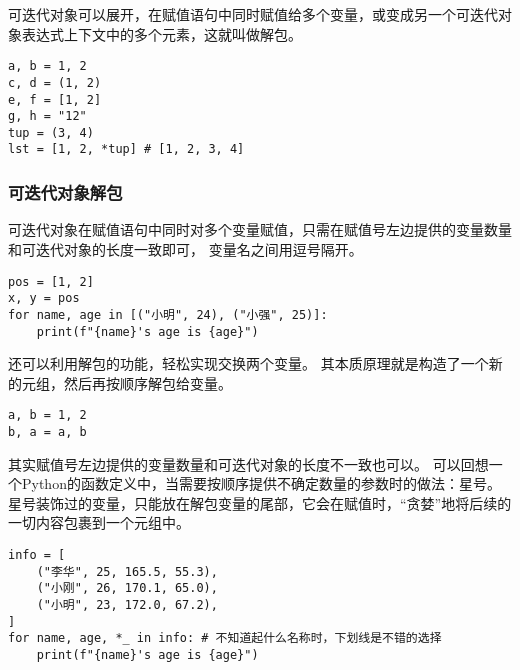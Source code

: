 \documentclass{ctexbook}
\begin{document}
可迭代对象可以展开，在赋值语句中同时赋值给多个变量，或变成另一个可迭代对象表达式上下文中的多个元素，这就叫做解包。

\begin{verbatim}
a, b = 1, 2
c, d = (1, 2)
e, f = [1, 2]
g, h = "12"
tup = (3, 4)
lst = [1, 2, *tup] # [1, 2, 3, 4]
\end{verbatim}

\subsubsection{可迭代对象解包}
可迭代对象在赋值语句中同时对多个变量赋值，只需在赋值号左边提供的变量数量和可迭代对象的长度一致即可，
变量名之间用逗号隔开。


\begin{verbatim}
pos = [1, 2]
x, y = pos
for name, age in [("小明", 24), ("小强", 25)]:
    print(f"{name}'s age is {age}")
\end{verbatim}

还可以利用解包的功能，轻松实现交换两个变量。
其本质原理就是构造了一个新的元组，然后再按顺序解包给变量。

\begin{verbatim}
a, b = 1, 2
b, a = a, b
\end{verbatim}

其实赋值号左边提供的变量数量和可迭代对象的长度不一致也可以。
可以回想一个Python的函数定义中，当需要按顺序提供不确定数量的参数时的做法：星号。
星号装饰过的变量，只能放在解包变量的尾部，它会在赋值时，``贪婪''地将后续的一切内容包裹到一个元组中。


\begin{verbatim}
info = [
    ("李华", 25, 165.5, 55.3),
    ("小刚", 26, 170.1, 65.0),
    ("小明", 23, 172.0, 67.2),
]
for name, age, *_ in info: # 不知道起什么名称时，下划线是不错的选择
    print(f"{name}'s age is {age}")
\end{verbatim}
\end{document}
